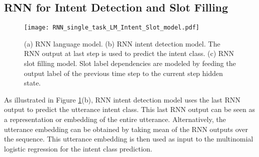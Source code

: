 \documentclass[11pt]{article}
\begin{document}
\begin{comment}
### Hide this comment part ###
    LSTM model replaces the recurrent module that uses sigmoid or hyperbolic tangent activation function in basic RNN with memory block. Memory block may contain one or more memory cells. The cell state contains summarized information of previous observations, the propagation of which is regulated by cell gates. 
      \begin{equation}
      \begin{split}
      f(t) &= \sigma(U_{f}x(t) + W_{f}h(t-1) + b_{f})\\
      i(t) &= \sigma(U_{i}x(t) + W_{i}h(t-1) + b_{i})\\
      \tilde{C}(t) &= tanh(U_{C}x(t) + W_{C}h(t-1) + b_{C}) \\
      C(t) &= f(t)*C(t-1) + i(t)*\tilde{C}(t) \\
      o(t) &= \sigma(U_{o}x(t) + W_{o}h(t-1) + b_{o}) \\
      h(t) &= o(t)*tanh(C(t))
      \end{split}
      \end{equation}
    where $f$, $i$ and $o$ are the forget gate, input gate and output gate respectively. $C$ is the cell state, and $h$ is the cell output. Figure 2(a) illustrates the architecture of the RNN language model. 
\end{comment}

\subsection{RNN for Intent Detection and Slot Filling}
    \begin{figure}[t]
        \centering
        \texttt{[image: RNN\_single\_task\_LM\_Intent\_Slot\_model.pdf]}
        \caption{{(a) RNN language model. (b) RNN intent detection model. The RNN output at last step is used to predict the intent class. (c) RNN slot filling model. Slot label dependencies are modeled by feeding the output label of the previous time step to the current step hidden state. }}
        \label{fig:RNN_single_task_LM_Intent_Slot_model}
    \end{figure}
    As illustrated in Figure \ref{fig:RNN_single_task_LM_Intent_Slot_model}(b), RNN intent detection model uses the last RNN output to predict the utterance intent class. This last RNN output can be seen as a representation or embedding of the entire utterance. Alternatively, the utterance embedding can be obtained by taking mean of the RNN outputs over the sequence. This utterance embedding is then used as input to the multinomial logistic regression for the intent class prediction.
\end{document}
